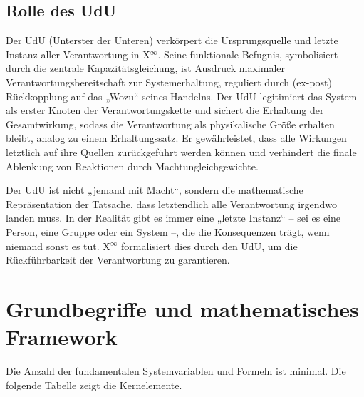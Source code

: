 \documentclass[12pt]{scrartcl}
\begin{document}
\subsection{Rolle des UdU}
\label{sec:UdU}
Der UdU (Unterster der Unteren) verkörpert die Ursprungsquelle und letzte Instanz aller Verantwortung in X$^\infty$. Seine funktionale Befugnis, symbolisiert durch die zentrale Kapazitätsgleichung, ist Ausdruck maximaler Verantwortungsbereitschaft zur Systemerhaltung, reguliert durch (ex-post) Rückkopplung auf das „Wozu“ seines Handelns. Der UdU legitimiert das System als erster Knoten der Verantwortungskette und sichert die Erhaltung der Gesamtwirkung, sodass die Verantwortung als physikalische Größe erhalten bleibt, analog zu einem Erhaltungssatz. Er gewährleistet, dass alle Wirkungen letztlich auf ihre Quellen zurückgeführt werden können und verhindert die finale Ablenkung von Reaktionen durch Machtungleichgewichte.

Der UdU ist nicht „jemand mit Macht“, sondern die mathematische Repräsentation der Tatsache, dass letztendlich alle Verantwortung irgendwo landen muss. In der Realität gibt es immer eine „letzte Instanz“ – sei es eine Person, eine Gruppe oder ein System –, die die Konsequenzen trägt, wenn niemand sonst es tut. X$^\infty$ formalisiert dies durch den UdU, um die Rückführbarkeit der Verantwortung zu garantieren.

\section{Grundbegriffe und mathematisches Framework}
\label{sec:GrundbegriffeUndFramework}

Die Anzahl der fundamentalen Systemvariablen und Formeln ist minimal. Die folgende Tabelle zeigt die Kernelemente.
\end{document}

